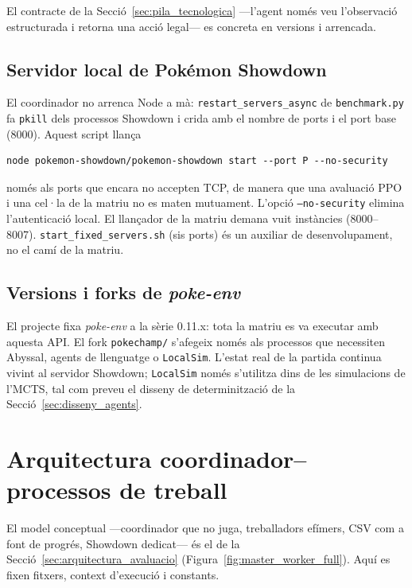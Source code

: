 El contracte de la Secció~\ref{sec:pila_tecnologica} ---l'agent només veu l'observació estructurada i retorna una acció legal--- es concreta en versions i arrencada.

\subsection{Servidor local de Pokémon Showdown}

El coordinador no arrenca Node a mà: \texttt{restart\_servers\_async} de \texttt{benchmark.py} fa \texttt{pkill} dels processos Showdown i crida  amb el nombre de ports i el port base (8000). Aquest script llança

\begin{verbatim}
node pokemon-showdown/pokemon-showdown start --port P --no-security
\end{verbatim}

només als ports que encara no accepten TCP, de manera que una avaluació PPO i una cel·la de la matriu no es maten mutuament. L'opció \texttt{--no-security} elimina l'autenticació local. El llançador de la matriu demana vuit instàncies (8000--8007). \texttt{start\_fixed\_servers.sh} (sis ports) és un auxiliar de desenvolupament, no el camí de la matriu.

\subsection{Versions i forks de \textit{poke-env}}

El projecte fixa \textit{poke-env} a la sèrie 0.11.x: tota la matriu es va executar amb aquesta API. El fork \texttt{pokechamp/} s'afegeix només als processos que necessiten Abyssal, agents de llenguatge o \texttt{LocalSim}. L'estat real de la partida continua vivint al servidor Showdown; \texttt{LocalSim} només s'utilitza dins de les simulacions de l'MCTS, tal com preveu el disseny de determinització de la Secció~\ref{sec:disseny_agents}.

\section{Arquitectura coordinador--processos de treball}
\label{sec:master_worker}

El model conceptual ---coordinador que no juga, treballadors efímers, CSV com a font de progrés, Showdown dedicat--- és el de la Secció~\ref{sec:arquitectura_avaluacio} (Figura~\ref{fig:master_worker_full}). Aquí es fixen fitxers, context d'execució i constants.


